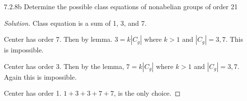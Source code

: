 \documentclass{article}
\newenvironment{solution}
{\renewcommand\qedsymbol{$\blacksquare$}\begin{proof}[Solution]}
{\end{proof}}
\begin{document}
\begin{PROB}{7.2.8b}\label{Problem 7.2.8b.}
    Determine the possible class equations of nonabelian groups of order 21
\end{PROB}
\begin{solution}
    Class equation is a sum of 1, 3, and 7.

    Center has order 7. Then by lemma. $3 = k|C_g|$ where $k > 1$ and $|C_g| = 3, 7$. This is impossible.

    Center has order 3. Then by the lemma, $7 = k|C_g|$ where $k > 1$ and $|C_g| = 3, 7$. Again this is impossible. 

    Center has order 1. $1 + 3 + 3 + 7 + 7$, is the only choice. 
\end{solution}

\bigskip
\end{document}
